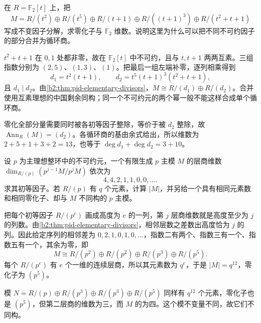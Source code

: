\begin{exercise}\label{b2:ex:04-primary-to-invariant}
	在 \(R=\mathbb F_2[t]\) 上，把
	\[
		M=R/(t^2)\oplus R/(t^5)\oplus R/(t+1) \oplus R/((t+1)^3)\oplus R/(t^2+t+1)
	\]
	写成不变因子分解，求零化子与 \(\mathbb F_2\) 维数。说明这里为什么可以把不同不可约因子的部分合并为循环商。
\end{exercise}
\begin{solution}
	\(t^2+t+1\) 在 \(0,1\) 处都非零，故在 \(\mathbb F_2[t]\) 中不可约，且与 \(t,t+1\) 两两互素。三组指数分别为 \((2,5)\)、\((1,3)\)、\((1)\)。把最后一组左端补零，逐列相乘得到
	\[
		d_1=t^2(t+1),\qquad d_2=t^5(t+1)^3(t^2+t+1),
	\]
	且 \(d_1\mid d_2\)。由\cref{b2:thm:pid-elementary-divisors}，\(M\cong R/(d_1)\oplus R/(d_2)\)。合并使用互素理想的中国剩余同构；同一个不可约元的两个幂一般不能这样合成单个循环商。

	零化全部分量需要同时被各初等因子整除，等价于被 \(d_2\) 整除，故 \(\operatorname{Ann}_R(M)=(d_2)\)。各循环商的基由余式给出，所以维数为 \(2+5+1+3+2=13\)，也等于 \(\deg d_1+\deg d_2=3+10\)。
\end{solution}

\begin{exercise}\label{b2:ex:04-primary-layers}
	设 \(p\) 为主理想整环中的不可约元，一个有限生成 \(p\) 主模 \(M\) 的层商维数 \(\dim_{R/(p)}(p^{j-1}M/p^jM)\) 依次为
	\[
		4,4,2,1,1,0,0,\ldots.
	\]
	求其初等因子。若 \(R/(p)\) 有 \(q\) 个元素，计算 \(|M|\)，并另给一个具有相同元素数和相同零化子、却与 \(M\) 不同构的 \(p\) 主模。
\end{exercise}
\begin{solution}
	把每个初等因子 \(R/(p^e)\) 画成高度为 \(e\) 的一列，第 \(j\) 层商维数就是高度至少为 \(j\) 的列数。由\cref{b2:thm:pid-elementary-divisors}，相邻层数之差数出高度恰为 \(j\) 的列。因此给定序列的相邻差为 \(0,2,1,0,1,0,\ldots\)，指数二有两个、指数三有一个、指数五有一个，其余为零，即
	\[
		M\cong R/(p^2)\oplus R/(p^2)\oplus R/(p^3)\oplus R/(p^5).
	\]
	每个 \(R/(p^e)\) 有 \(e\) 个一维的连续层商，所以其元素数为 \(q^e\)，于是 \(|M|=q^{12}\)，零化子为 \((p^5)\)。

	模 \(N=R/(p)\oplus R/(p^3)\oplus R/(p^3)\oplus R/(p^5)\) 同样有 \(q^{12}\) 个元素，零化子也是 \((p^5)\)，但第二层商的维数为三，而 \(M\) 的为四。这个模不变量不同，故它们不同构。
\end{solution}

